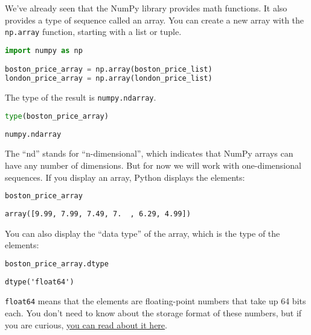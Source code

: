 We've already seen that the NumPy library provides math functions. It
also provides a type of sequence called an array. You can create a new
array with the \passthrough{\lstinline!np.array!} function, starting
with a list or tuple.

\begin{lstlisting}[language=Python]
import numpy as np

boston_price_array = np.array(boston_price_list)
london_price_array = np.array(london_price_list)
\end{lstlisting}

The type of the result is \passthrough{\lstinline!numpy.ndarray!}.

\begin{lstlisting}[language=Python]
type(boston_price_array)
\end{lstlisting}

\begin{lstlisting}[]
numpy.ndarray
\end{lstlisting}

The ``nd'' stands for ``n-dimensional'', which indicates that NumPy
arrays can have any number of dimensions. But for now we will work with
one-dimensional sequences. If you display an array, Python displays the
elements:

\begin{lstlisting}[language=Python]
boston_price_array
\end{lstlisting}

\begin{lstlisting}[]
array([9.99, 7.99, 7.49, 7.  , 6.29, 4.99])
\end{lstlisting}

You can also display the ``data type'' of the array, which is the type
of the elements:

\begin{lstlisting}[language=Python]
boston_price_array.dtype
\end{lstlisting}

\begin{lstlisting}[]
dtype('float64')
\end{lstlisting}

\passthrough{\lstinline!float64!} means that the elements are
floating-point numbers that take up 64 bits each. You don't need to know
about the storage format of these numbers, but if you are curious,
\href{https://en.wikipedia.org/wiki/Floating-point_arithmetic\#Internal_representation}{you
can read about it here}.

